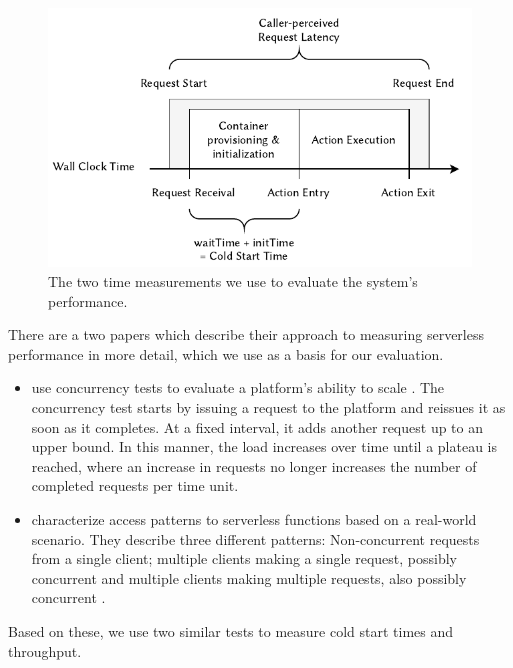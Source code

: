 \begin{figure}
    \begin{center}
        \includegraphics{figures/EvaluationTimeMeasurement.pdf}
    \end{center}
    \caption{The two time measurements we use to evaluate the system's performance.}
    \label{fig:evaluation-time-measurement}
\end{figure}

There are a two papers which describe their approach to measuring serverless performance in more detail, which we use as a basis for our evaluation.

\begin{itemize}
    \item \citeauthor{McGrath2017} use concurrency tests to evaluate a platform's ability to scale \cite{McGrath2017}. The concurrency test starts by issuing a request to the platform and reissues it as soon as it completes. At a fixed interval, it adds another request up to an upper bound. In this manner, the load increases over time until a plateau is reached, where an increase in requests no longer increases the number of completed requests per time unit.
    \item \citeauthor{Hall2019} characterize access patterns to serverless functions based on a real-world scenario. They describe three different patterns: Non-concurrent requests from a single client; multiple clients making a single request, possibly concurrent and multiple clients making multiple requests, also possibly concurrent \cite{Hall2019}.
\end{itemize}

Based on these, we use two similar tests to measure cold start times and throughput.

